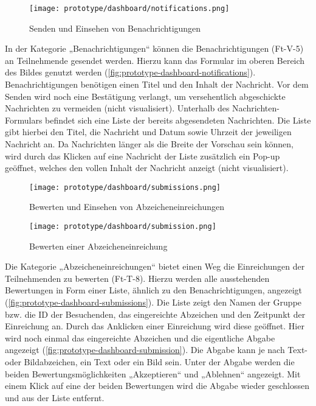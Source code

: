 \begin{figure}[htb]
    \centering
    \texttt{[image: prototype/dashboard/notifications.png]}
    \caption{Senden und Einsehen von Benachrichtigungen}
    \label{fig:prototype-dashboard-notifications}
\end{figure}

In der Kategorie „Benachrichtigungen“ können die Benachrichtigungen (Ft-V-5) an
Teilnehmende gesendet werden. Hierzu kann das Formular im oberen Bereich des
Bildes genutzt werden (\autoref{fig:prototype-dashboard-notifications}).
Benachrichtigungen benötigen einen Titel und den Inhalt der Nachricht. Vor dem
Senden wird noch eine Bestätigung verlangt, um versehentlich abgeschickte
Nachrichten zu vermeiden (nicht visualisiert). Unterhalb des
Nachrichten-Formulars befindet sich eine Liste der bereits abgesendeten
Nachrichten. Die Liste gibt hierbei den Titel, die Nachricht und Datum sowie
Uhrzeit der jeweiligen Nachricht an. Da Nachrichten länger als die Breite der
Vorschau sein können, wird durch das Klicken auf eine Nachricht der Liste
zusätzlich ein Pop-up geöffnet, welches den vollen Inhalt der Nachricht anzeigt
(nicht visualisiert).

\begin{figure}[htpb]
    \centering
    \texttt{[image: prototype/dashboard/submissions.png]}
    \caption{Bewerten und Einsehen von Abzeicheneinreichungen}
    \label{fig:prototype-dashboard-submissions}
\end{figure}

\begin{figure}[htpb]
    \centering
    \texttt{[image: prototype/dashboard/submission.png]}
    \caption{Bewerten einer Abzeicheneinreichung}
    \label{fig:prototype-dashboard-submission}
\end{figure}

Die Kategorie „Abzeicheneinreichungen“ bietet einen Weg die Einreichungen der
Teilnehmenden zu bewerten (Ft-T-8). Hierzu werden alle ausstehenden Bewertungen
in Form einer Liste, ähnlich zu den Benachrichtigungen, angezeigt
(\autoref{fig:prototype-dashboard-submissions}). Die Liste zeigt den Namen der
Gruppe bzw. die ID der Besuchenden, das eingereichte Abzeichen und den Zeitpunkt
der Einreichung an. Durch das Anklicken einer Einreichung wird diese geöffnet.
Hier wird noch einmal das eingereichte Abzeichen und die eigentliche Abgabe
angezeigt (\autoref{fig:prototype-dashboard-submission}). Die Abgabe kann je
nach Text- oder Bildabzeichen, ein Text oder ein Bild sein. Unter der Abgabe
werden die beiden Bewertungsmöglichkeiten „Akzeptieren“ und „Ablehnen“
angezeigt. Mit einem Klick auf eine der beiden Bewertungen wird die Abgabe
wieder geschlossen und aus der Liste entfernt.

